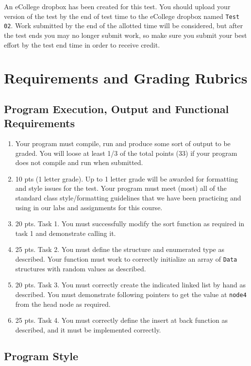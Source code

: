 \documentclass[11pt]{article}
\begin{document}
An eCollege dropbox has been created for this test.  You should upload
your version of the test by the end of test time to the eCollege
dropbox named \verb~Test 02~.  Work submitted by the end of the allotted
time will be considered, but after the test ends you may no longer
submit work, so make sure you submit your best effort by the test end
time in order to receive credit.
\section*{Requirements and Grading Rubrics}
\label{sec-4}
\subsection*{Program Execution, Output and Functional Requirements}
\label{sec-4-1}


\begin{enumerate}
\item Your program must compile, run and produce some sort of output to
   be graded. You will loose at least 1/3 of the total points (33) if
   your program does not compile and run when submitted.
\item 10 pts (1 letter grade).  Up to 1 letter grade will be awarded for
   formatting and style issues for the test.  Your program must meet
   (most) all of the standard class style/formatting guidelines that
   we have been practicing and using in our labs and assignments for
   this course.
\item 20 pts. Task 1.  You must successfully modify the sort function as
   required in task 1 and demonstrate calling it.
\item 25 pts.  Task 2.  You must define the structure and enumerated type
   as described.  Your function must work to correctly initialize
   an array of \verb~Data~ structures with random values as described.
\item 20 pts. Task 3.  You must correctly create the indicated linked
   list by hand as described.  You must demonstrate following
   pointers to get the value at \verb~node4~ from the head node as
   required.
\item 25 pts.  Task 4. You must correctly define the insert at back
   function as described, and it must be implemented correctly.
\end{enumerate}
\subsection*{Program Style}
\label{sec-4-2}
\end{document}
